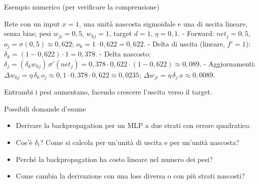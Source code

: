 \begin{boxexample}{Esempio numerico (per verificare la comprensione)}

Rete con un input \(x = 1\), una unità nascosta sigmoidale e una di
uscita lineare, senza bias; pesi \(w_{ji} = 0{,}5\), \(w_{kj} = 1\),
target \(d = 1\), \(\eta = 0{,}1\). - Forward: \(net_j = 0{,}5\),
\(o_j = \sigma(0{,}5) \approx 0{,}622\);
\(o_k = 1 \cdot 0{,}622 = 0{,}622\). - Delta di uscita (lineare,
\(f' = 1\)): \(\delta_k = (1 - 0{,}622)\cdot 1 = 0{,}378\). - Delta
nascosto:
\(\delta_j = (\delta_k w_{kj})\,\sigma'(net_j) = 0{,}378 \cdot 0{,}622 \cdot (1 - 0{,}622) \approx 0{,}089\).
- Aggiornamenti:
\(\Delta w_{kj} = \eta\,\delta_k\,o_j \approx 0{,}1 \cdot 0{,}378 \cdot 0{,}622 \approx 0{,}0235\);
\(\Delta w_{ji} = \eta\,\delta_j\,x \approx 0{,}0089\).

Entrambi i pesi aumentano, facendo crescere l'uscita verso il target.

\end{boxexample}

\begin{boxquestion}{Possibili domande d'esame}

\begin{itemize}
\tightlist
\item
  Derivare la backpropagation per un MLP a due strati con errore
  quadratico.
\item
  Cos'è \(\delta_t\)? Come si calcola per un'unità di uscita e per
  un'unità nascosta?
\item
  Perché la backpropagation ha costo lineare nel numero dei pesi?
\item
  Come cambia la derivazione con una loss diversa o con più strati
  nascosti?
\end{itemize}

\end{boxquestion}
